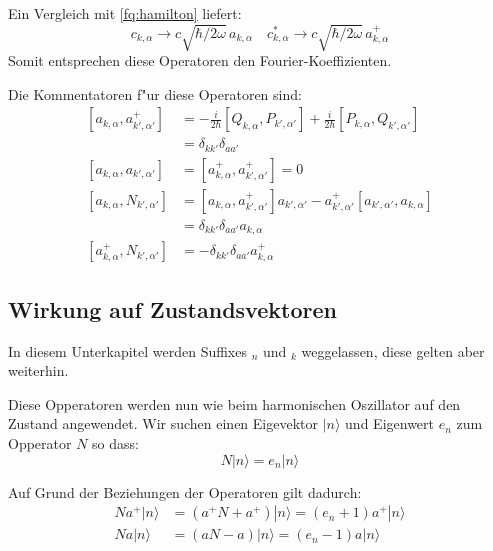 Ein Vergleich mit \ref{fq:hamilton} liefert:
\begin{equation}
 c_{k,\alpha} \rightarrow c \sqrt{\hbar/2 \omega} \, a_{k,\alpha} \quad c^*_{k,\alpha} \rightarrow c \sqrt{\hbar/2 \omega} \, a^+_{k,\alpha}
\end{equation}
Somit entsprechen diese Operatoren den Fourier-Koeffizienten.

Die Kommentatoren f"ur diese Operatoren sind:
\begin{equation}
\begin{split}
[a_{k,\alpha} , a^+_{k',\alpha'}] &= - \frac{i}{2 \hbar} [Q_{k,\alpha}, P_{k',\alpha'}] + \frac{i}{2 \hbar} [P_{k,\alpha}, Q_{k',\alpha'}] \\
	 &= \delta_{kk'}\delta_{aa'} \\
[a_{k,\alpha} , a_{k',\alpha'}] &= [a^+_{k,\alpha} , a^+_{k',\alpha'}] = 0 \\
[a_{k,\alpha} , N_{k',\alpha'}] &= [a_{k,\alpha} , a^+_{k',\alpha'}]a_{k',\alpha'} - a^+_{k',\alpha'}[a_{k',\alpha'} , a_{k,\alpha}]\\
	&= \delta_{kk'}\delta_{aa'} a_{k,\alpha} \\
[a^+_{k,\alpha} , N_{k',\alpha'}] &= -\delta_{kk'}\delta_{aa'} a^+_{k,\alpha}
\end{split}
\end{equation}

\subsection{Wirkung auf Zustandsvektoren}

In diesem Unterkapitel werden Suffixes $_n$ und $_k$ weggelassen, diese gelten aber weiterhin. 

Diese Opperatoren werden nun wie beim harmonischen Oszillator auf den Zustand angewendet. Wir suchen einen Eigevektor $|n\rangle$ und Eigenwert $e_n$ zum Opperator $N$ so dass:
\begin{equation}
N|n\rangle = e_n|n\rangle
\end{equation}

Auf Grund der Beziehungen der Operatoren gilt dadurch:
\begin{equation}
\begin{split}
Na^+|n\rangle &= (a^+N + a^+)|n\rangle = (e_n + 1)a^+|n\rangle \\
Na|n\rangle &= (aN - a)|n\rangle = (e_n - 1)a|n\rangle
\end{split}
\end{equation}

